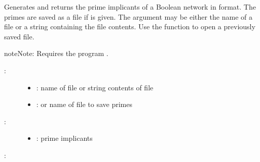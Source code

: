 \documentclass[letterpaper,10pt,english]{sphinxmanual}
\begin{document}
\begin{fulllineitems}
\label{\detokenize{FileExchange:PyBoolNet.FileExchange.bnet2primes}}
Generates and returns the prime implicants of a Boolean network in {\hyperref[\detokenize{Installation:installation-boolnet}]{}} format.
The primes are saved as a  file if  is given.
The argument  may be either the name of a  file or a string containing the file contents.
Use the function {\hyperref[\detokenize{FileExchange:read-primes}]{}} to open a previously saved  file.

\begin{sphinxadmonition}{note}{Note:}
Requires the program {\hyperref[\detokenize{Installation:installation-bnettoprime}]{}}.
\end{sphinxadmonition}
\begin{description}
\item[{:}] \leavevmode\begin{itemize}
\item {} 
: name of  file or string contents of file

\item {} 
:  or name of  file to save primes

\end{itemize}

\item[{:    }] \leavevmode\begin{itemize}
\item {} 
: prime implicants

\end{itemize}

\end{description}

:


\end{fulllineitems}
\end{document}
